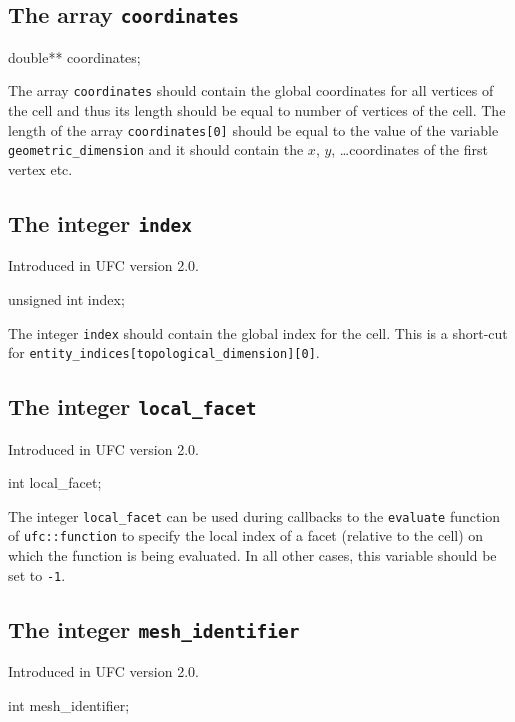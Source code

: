 \subsection{The array \texttt{coordinates}}

\begin{code}
double** coordinates;
\end{code}

The array \texttt{coordinates} should contain the global coordinates
for all vertices of the cell and thus its length should be equal to
number of vertices of the cell. The length of the array
\texttt{coordinates[0]} should be equal to the value of the variable
\texttt{geometric\_dimension} and it should contain the $x$, $y$,
\ldots coordinates of the first vertex etc.

\subsection{The integer \texttt{index}}
Introduced in UFC version 2.0.

\begin{code}
unsigned int index;
\end{code}

The integer \texttt{index} should contain the global index for the
cell. This is a short-cut for
\texttt{entity\_indices[topological\_dimension][0]}.

\subsection{The integer \texttt{local\_facet}}
Introduced in UFC version 2.0.

\begin{code}
int local_facet;
\end{code}

The integer \texttt{local\_facet} can be used during callbacks to the
\texttt{evaluate} function of \texttt{ufc::function} to specify the
local index of a facet (relative to the cell) on which the function is
being evaluated. In all other cases, this variable should be set to
\texttt{-1}.

\subsection{The integer \texttt{mesh\_identifier}}
Introduced in UFC version 2.0.

\begin{code}
int mesh_identifier;
\end{code}


